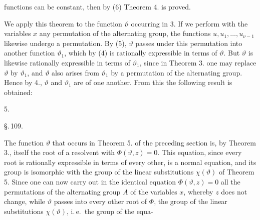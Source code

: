 functions can be constant, then by (6) Theorem 4.
is proved.

We apply this theorem to the function $\vartheta$ occurring in 3.
If we perform with the variables $x$ any permutation
of the alternating group, the functions
$u, u_1, \ldots, u_{\nu-1}$ likewise undergo a permutation. By
(5), $\vartheta$ passes under this permutation into another function $\vartheta_1$,
which by (4) is rationally expressible in terms of $\vartheta$. But
$\vartheta$ is likewise rationally expressible in terms of $\vartheta_1$, since in
Theorem 3. one may replace $\vartheta$ by $\vartheta_1$, and $\vartheta$ also arises from $\vartheta_1$
by a permutation of the alternating group. Hence
by 4., $\vartheta$ and $\vartheta_1$ are  of one another.
From this the following result is obtained:

5.~

\begin{center}
\S.\,109.

\end{center}

The function $\vartheta$ that occurs in Theorem 5. of the preceding section
is, by Theorem 3., itself the root of a resolvent
with  $\Phi(\vartheta, z) = 0$. This equation,
since every root is rationally expressible in terms of every other,
is a normal equation, and its  group is isomorphic
with the group of the linear substitutions $\chi(\vartheta)$ of
Theorem 5. Since one can now carry out in the identical equation $\Phi(\vartheta, z) = 0$
all the permutations of the alternating group $A$ of the variables $x$,
whereby $z$ does not change, while $\vartheta$ passes into every
other root of $\Phi$, the group of the linear
substitutions $\chi(\vartheta)$, i.\,e.\ the  group of the equa-

